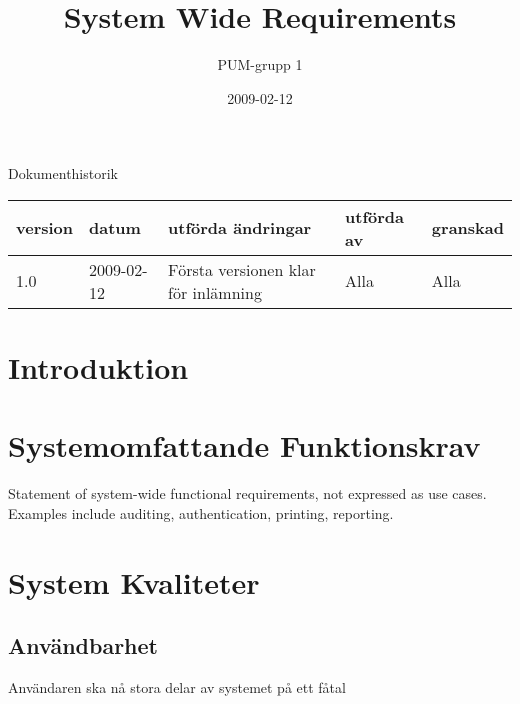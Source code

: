 

\ifpdf
\else
\fi

\title{System Wide Requirements}
\author{PUM-grupp 1}
\date{2009-02-12}



\maketitle\thispagestyle{empty}

\newpage

{\centering \Large{Dokumenthistorik\\}}

\vspace{10pt}
\begin{tabularx}{\textwidth}{ |l|l|X|l|l| }
  \hline
    \textbf{version} & \textbf{datum} & \textbf{utförda ändringar} & \textbf{utförda av} & \textbf{granskad} \\
	\hline 
  1.0 & 2009-02-12 &  Första versionen klar för inlämning  & Alla & Alla   \\
  \hline
\end{tabularx}

\newpage

\setcounter{tocdepth}{2}
\tableofcontents
\newpage

\section{Introduktion}

\section{Systemomfattande Funktionskrav}

Statement of system-wide functional requirements, not expressed as use cases. Examples include auditing, authentication, printing, reporting.

\section{System Kvaliteter}
\subsection{Användbarhet}
Användaren ska nå stora delar av systemet på ett fåtal
